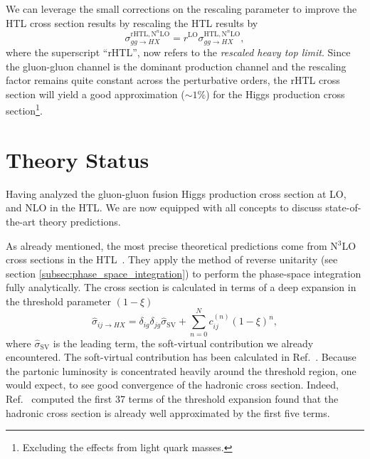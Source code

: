 We can leverage the small corrections on the rescaling parameter to improve the \acs{HTL} cross section results by rescaling the \acs{HTL} results by
\begin{equation}
\sigma_{gg \rightarrow HX}^{\mathrm{rHTL}, \mathrm{N}^n\mathrm{LO}} = r^{\mathrm{LO}} \sigma_{gg \rightarrow HX}^{\mathrm{HTL}, \mathrm{N}^n\mathrm{LO}},
\end{equation}
where the superscript ``\acs{rHTL}'', now refers to the \textit{rescaled heavy top limit}. Since the gluon-gluon channel is the dominant production channel and the rescaling factor remains quite constant across the perturbative orders, the \acs{rHTL} cross section will yield a good approximation ($\sim 1 \%$) for the Higgs production cross section\footnote{Excluding the effects from light quark masses.}.




\section{Theory Status}
Having analyzed the gluon-gluon fusion Higgs production cross section at \acs{LO}, and \acs{NLO} in the \acs{HTL}. We are now equipped with all concepts to discuss state-of-the-art theory predictions.

As already mentioned, the most precise theoretical predictions come from N${}^3$LO cross sections in the \acs{HTL}~\cite{Anastasiou:2015vya, Anastasiou:2016cez}. They apply the method of reverse unitarity (see section \ref{subsec:phase_space_integration}) to perform the phase-space integration fully analytically. The cross section is calculated in terms of a deep expansion in the threshold parameter $(1 - \xi)$
\begin{equation}
\hat{\sigma}_{ij \rightarrow HX} = \delta_{ig} \delta_{jg} \hat{\sigma}_{\mathrm{SV}} + \sum_{n = 0}^N c_{ij}^{(n)} (1 - \xi)^n,
\label{eq:4:threshold_expansion}
\end{equation}
where $\hat{\sigma}_{\mathrm{SV}}$ is the leading term, the soft-virtual contribution we already encountered. The soft-virtual contribution has been calculated in Ref.~\cite{Anastasiou:2014vaa}. Because the partonic luminosity is concentrated heavily around the threshold region, one would expect, to see good convergence of the hadronic cross section. Indeed, Ref.~\cite{Anastasiou:2015vya} computed the first 37 terms of the threshold expansion found that the hadronic cross section is already well approximated by the first five terms.

